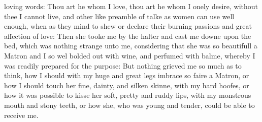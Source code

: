 loving words: Thou art he whom I love, thou art he whom I onely desire, without
thee I cannot live, and other like preamble of talke as women can use well
enough, when as they mind to shew or declare their burning passions and great
affection of love: Then she tooke me by the halter and cast me downe upon the
bed, which was nothing strange unto me, considering that she was so beautifull
a Matron and I so wel bolded out with wine, and perfumed with balme, whereby I
was readily prepared for the purpose: But nothing grieved me so much as to
think, how I should with my huge and great legs imbrace so faire a Matron, or
how I should touch her fine, dainty, and silken skinne, with my hard hoofes, or
how it was possible to kisse her soft, pretty and ruddy lips, with my monstrous
mouth and stony teeth, or how she, who was young and tender, could be able to
receive me.

